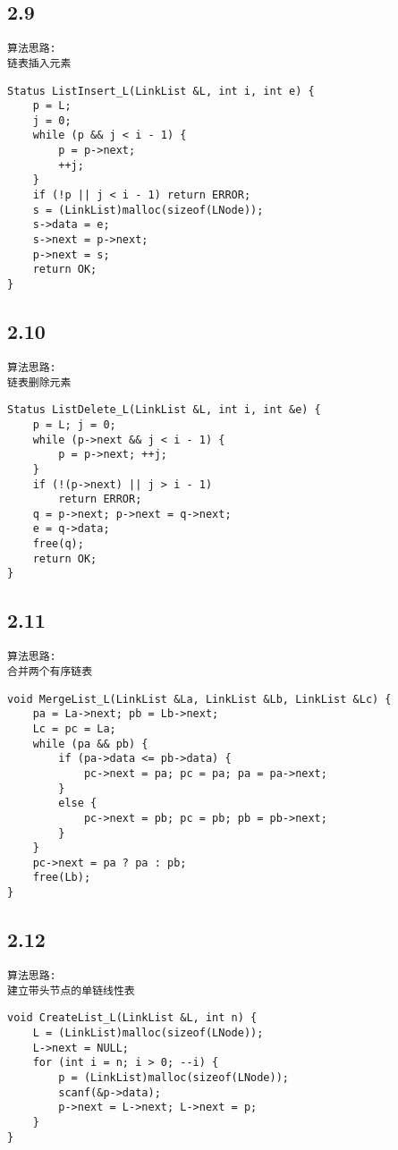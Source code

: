 \subsection{2.9}
\begin{lstlisting}[basicstyle=\small\ttfamily, caption={}, numbers=none]
算法思路:
链表插入元素
\end{lstlisting}
\begin{lstlisting}[basicstyle=\small\ttfamily, caption={}, numbers=none]
Status ListInsert_L(LinkList &L, int i, int e) {
	p = L;
	j = 0;
	while (p && j < i - 1) {
		p = p->next;
		++j;
	}
	if (!p || j < i - 1) return ERROR;
	s = (LinkList)malloc(sizeof(LNode));
	s->data = e;
	s->next = p->next;
	p->next = s;
	return OK;
}
\end{lstlisting}

\subsection{2.10}
\begin{lstlisting}[basicstyle=\small\ttfamily, caption={}, numbers=none]
算法思路:
链表删除元素
\end{lstlisting}
\begin{lstlisting}[basicstyle=\small\ttfamily, caption={}, numbers=none]
Status ListDelete_L(LinkList &L, int i, int &e) {
	p = L; j = 0;
	while (p->next && j < i - 1) {
		p = p->next; ++j;
	}
	if (!(p->next) || j > i - 1)
		return ERROR;
	q = p->next; p->next = q->next;
	e = q->data;
	free(q);
	return OK;
}
\end{lstlisting}

\subsection{2.11}
\begin{lstlisting}[basicstyle=\small\ttfamily, caption={}, numbers=none]
算法思路:
合并两个有序链表
\end{lstlisting}
\begin{lstlisting}[basicstyle=\small\ttfamily, caption={}, numbers=none]
void MergeList_L(LinkList &La, LinkList &Lb, LinkList &Lc) {
	pa = La->next; pb = Lb->next;
	Lc = pc = La;
	while (pa && pb) {
		if (pa->data <= pb->data) {
			pc->next = pa; pc = pa; pa = pa->next;
		}
		else {
			pc->next = pb; pc = pb; pb = pb->next;
		}
	}
	pc->next = pa ? pa : pb;
	free(Lb);
}
\end{lstlisting}


\subsection{2.12}
\begin{lstlisting}[basicstyle=\small\ttfamily, caption={}, numbers=none]
算法思路:
建立带头节点的单链线性表
\end{lstlisting}
\begin{lstlisting}[basicstyle=\small\ttfamily, caption={}, numbers=none]
void CreateList_L(LinkList &L, int n) {
	L = (LinkList)malloc(sizeof(LNode));
	L->next = NULL;
	for (int i = n; i > 0; --i) {
		p = (LinkList)malloc(sizeof(LNode));
		scanf(&p->data);
		p->next = L->next; L->next = p;
	}
}
\end{lstlisting}


